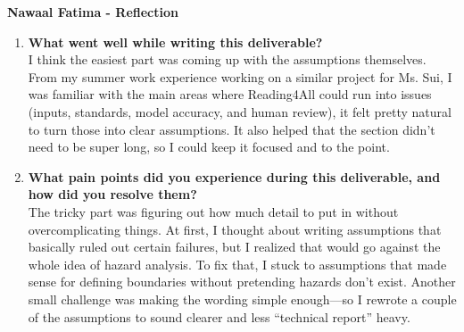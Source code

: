 \documentclass{article}
\begin{document}
\textbf{Nawaal Fatima - Reflection}
\begin{enumerate}
  \item \textbf{What went well while writing this deliverable?}\\
    I think the easiest part was coming up with the assumptions
    themselves. From my summer work experience working on a
    similar project for Ms. Sui, I was familiar with the main areas
    where Reading4All could run into issues (inputs, standards, model accuracy, and
    human review), it felt pretty natural to turn those into clear
    assumptions. It also helped that the section didn’t need to be
    super long, so I could keep it focused and to the point.
  \item \textbf{What pain points did you experience during this
    deliverable, and how did you resolve them?}\\
    The tricky part was figuring out how much detail to put in
    without overcomplicating things. At first, I thought about
    writing assumptions that basically ruled out certain failures,
    but I realized that would go against the whole idea of hazard
    analysis. To fix that, I stuck to assumptions that made sense for
    defining boundaries without pretending hazards don’t exist.
    Another small challenge was making the wording simple enough—so I
    rewrote a couple of the assumptions to sound clearer and less
    “technical report” heavy.
\end{enumerate}
\end{document}
